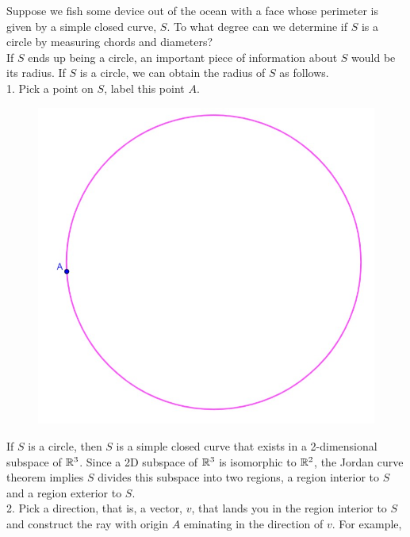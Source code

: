 \documentclass[11pt]{article}
\begin{document}
\maketitle
Suppose we fish some device out of the ocean with a face whose perimeter is given by a simple closed curve, \(S\).  To what degree can we determine if \(S\) is a circle by measuring chords and diameters?
\\[2\baselineskip]
If \(S\) ends up being a circle, an important piece of information about \(S\) would be its radius.  If \(S\) is a circle, we can obtain the radius of \(S\) as follows.
\\[1\baselineskip]
1. Pick a point on \(S\), label this point \(A\).
\begin{center}
	\begin{figure}[h]
		\includegraphics[scale=0.6]{circle_1.jpg}
	\end{figure}
\end{center}
If \(S\) is a circle, then \(S\) is a simple closed curve that exists in a 2-dimensional subspace of \(\mathbb{R}^3\).  Since a 2D subspace of \(\mathbb{R}^3\) is isomorphic to \(\mathbb{R}^2\), the Jordan curve theorem implies \(S\) divides this subspace into two regions, a region interior to \(S\) and a region exterior to \(S\).
\\[2\baselineskip]
2. Pick a direction, that is, a vector, \(v\), that lands you in the region interior to \(S\) and construct the ray with origin \(A\) eminating in the direction of \(v\).  For example,
\end{document}
